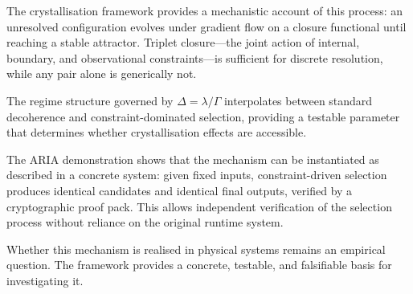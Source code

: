 \documentclass[12pt]{article}
\begin{document}
The crystallisation framework provides a mechanistic account of this process: an unresolved configuration evolves under gradient flow on a closure functional until reaching a stable attractor. Triplet closure---the joint action of internal, boundary, and observational constraints---is sufficient for discrete resolution, while any pair alone is generically not.

The regime structure governed by $\Delta = \lambda/\Gamma$ interpolates between standard decoherence and constraint-dominated selection, providing a testable parameter that determines whether crystallisation effects are accessible.

The ARIA demonstration shows that the mechanism can be instantiated as described in a concrete system: given fixed inputs, constraint-driven selection produces identical candidates and identical final outputs, verified by a cryptographic proof pack. This allows independent verification of the selection process without reliance on the original runtime system.

Whether this mechanism is realised in physical systems remains an empirical question. The framework provides a concrete, testable, and falsifiable basis for investigating it.



\end{document}
